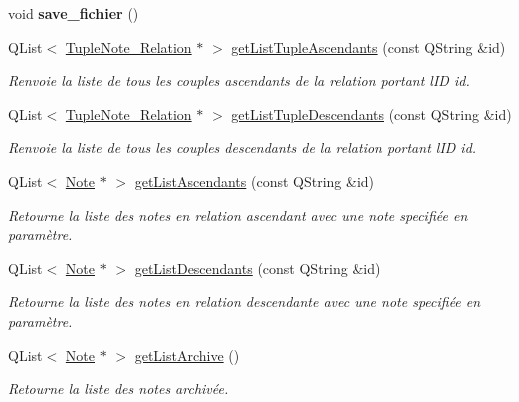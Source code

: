 \begin{DoxyCompactItemize}
\item 
\mbox{\label{class_notes_manager_a76c059043681ec4c41d91e75e06ea353}} 
void {\bfseries save\+\_\+fichier} ()
\item 
Q\+List$<$ \hyperlink{class_tuple_note___relation}{Tuple\+Note\+\_\+\+Relation} $\ast$ $>$ \hyperlink{class_notes_manager_a9f2c72d67d67c89a61f77a9b1a0ae390}{get\+List\+Tuple\+Ascendants} (const Q\+String \&id)
\begin{DoxyCompactList}\small\item\em Renvoie la liste de tous les couples ascendants de la relation portant l\textquotesingle{}ID id. \end{DoxyCompactList}\item 
Q\+List$<$ \hyperlink{class_tuple_note___relation}{Tuple\+Note\+\_\+\+Relation} $\ast$ $>$ \hyperlink{class_notes_manager_a4b8636fd8bc9d750d778585d3e4372cf}{get\+List\+Tuple\+Descendants} (const Q\+String \&id)
\begin{DoxyCompactList}\small\item\em Renvoie la liste de tous les couples descendants de la relation portant l\textquotesingle{}ID id. \end{DoxyCompactList}\item 
Q\+List$<$ \hyperlink{class_note}{Note} $\ast$ $>$ \hyperlink{class_notes_manager_ac85019776c1e8653665e24abc9d8001d}{get\+List\+Ascendants} (const Q\+String \&id)
\begin{DoxyCompactList}\small\item\em Retourne la liste des notes en relation ascendant avec une note specifiée en paramètre. \end{DoxyCompactList}\item 
Q\+List$<$ \hyperlink{class_note}{Note} $\ast$ $>$ \hyperlink{class_notes_manager_a2ed035544b433b9cddfc83fb4c081a65}{get\+List\+Descendants} (const Q\+String \&id)
\begin{DoxyCompactList}\small\item\em Retourne la liste des notes en relation descendante avec une note specifiée en paramètre. \end{DoxyCompactList}\item 
\mbox{\label{class_notes_manager_a81aee1d57c39232f870199acb356fc57}} 
Q\+List$<$ \hyperlink{class_note}{Note} $\ast$ $>$ \hyperlink{class_notes_manager_a81aee1d57c39232f870199acb356fc57}{get\+List\+Archive} ()
\begin{DoxyCompactList}\small\item\em Retourne la liste des notes archivée. \end{DoxyCompactList}\item 

\end{DoxyCompactItemize}
